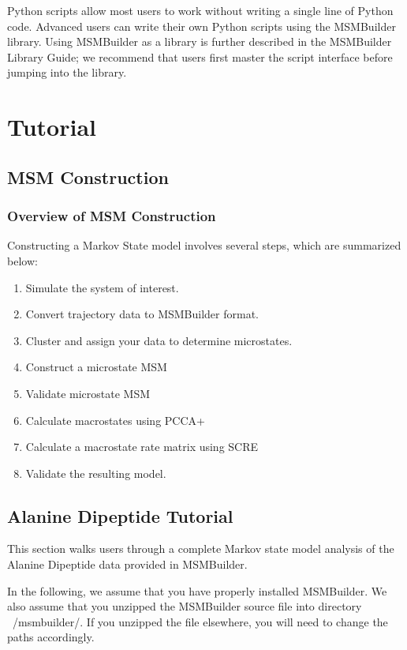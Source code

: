 \documentclass[12pt]{article}
\begin{document}
Python scripts allow most users to work without writing a single line of Python code.  Advanced users can write their own Python scripts using the MSMBuilder library.  Using MSMBuilder as a library is further described in the MSMBuilder Library Guide; we recommend that users first master the script interface before jumping into the library.  

\newpage

\section{Tutorial}
\subsection{MSM Construction}

\subsubsection{Overview of MSM Construction}
Constructing a Markov State model involves several steps, which are summarized below:
\begin{enumerate}
 \item Simulate the system of interest.
 \item Convert trajectory data to MSMBuilder format.
 \item Cluster and assign your data to determine microstates.
 \item Construct a microstate MSM
 \item Validate microstate MSM
 \item Calculate macrostates using PCCA+
 \item Calculate a macrostate rate matrix using SCRE
 \item Validate the resulting model.
\end{enumerate}

\subsection{Alanine Dipeptide Tutorial}

This section walks users through a complete Markov state model analysis of the Alanine Dipeptide data provided in MSMBuilder.

In the following, we assume that you have properly installed MSMBuilder.  We also assume that you unzipped the MSMBuilder source file into directory ~/msmbuilder/.  If you unzipped the file elsewhere, you will need to change the paths accordingly.  
\end{document}
